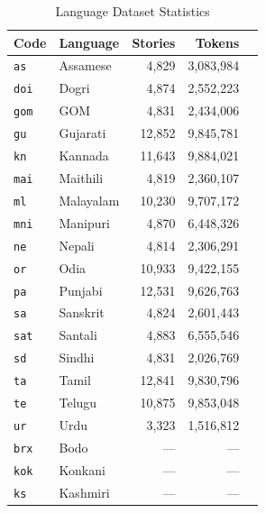 \documentclass[11pt]{article} %
\begin{document}
    \begin{table}[htbp]
        \centering
        \caption{\citet{multilingual_tinystories_2026} Language Dataset Statistics}
        \label{tab:language-stats}
        \begin{tabular}{llrrl}
            \toprule \textbf{Code} & \textbf{Language} & \textbf{Stories} & \textbf{Tokens} &  \\
            \midrule \texttt{as}   & Assamese          & 4,829            & 3,083,984        \\
            \texttt{doi}           & Dogri             & 4,874            & 2,552,223        \\
            \texttt{gom}           & GOM               & 4,831            & 2,434,006        \\
            \texttt{gu}            & Gujarati          & 12,852           & 9,845,781        \\
            \texttt{kn}            & Kannada           & 11,643           & 9,884,021        \\
            \texttt{mai}           & Maithili          & 4,819            & 2,360,107        \\
            \texttt{ml}            & Malayalam         & 10,230           & 9,707,172        \\
            \texttt{mni}           & Manipuri          & 4,870            & 6,448,326        \\
            \texttt{ne}            & Nepali            & 4,814            & 2,306,291        \\
            \texttt{or}            & Odia              & 10,933           & 9,422,155        \\
            \texttt{pa}            & Punjabi           & 12,531           & 9,626,763        \\
            \texttt{sa}            & Sanskrit          & 4,824            & 2,601,443        \\
            \texttt{sat}           & Santali           & 4,883            & 6,555,546        \\
            \texttt{sd}            & Sindhi            & 4,831            & 2,026,769        \\
            \texttt{ta}            & Tamil             & 12,841           & 9,830,796        \\
            \texttt{te}            & Telugu            & 10,875           & 9,853,048        \\
            \texttt{ur}            & Urdu              & 3,323            & 1,516,812        \\
            \midrule \texttt{brx}  & Bodo              & ---              & ---              \\
            \texttt{kok}           & Konkani           & ---              & ---              \\
            \texttt{ks}            & Kashmiri          & ---              & ---              \\
            \bottomrule
        \end{tabular}
    \end{table}
\end{document}
